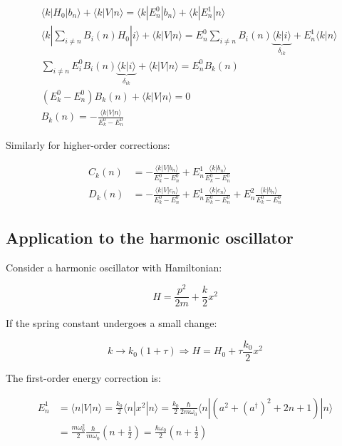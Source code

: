 \documentclass[italian]{HKNdocument}
\begin{document}
\begin{align}
&\langle k|H_0|b_n\rangle+\langle k|V|n\rangle=\langle k|E_n^0|b_n\rangle+\langle k|E_n^1|n\rangle\\
&\langle k|\sum_{i\neq n}B_i(n)H_0|i\rangle+\langle k|V|n\rangle=E_n^0\sum_{i\neq n}B_i(n)\underbrace{\langle k|i\rangle}_{\delta_{ik}}+E_n^1\langle k|n\rangle\\
&\sum_{i\neq n}E_i^0B_i(n)\underbrace{\langle k|i\rangle}_{\delta_{ik}}+\langle k|V|n\rangle=E_n^0B_k(n) \label{eq:13.17}\\
&(E_k^0-E_n^0)B_k(n)+\langle k|V|n\rangle=0\\
&B_k(n)=-\frac{\langle k|V|n\rangle}{E_k^0-E_n^0}
\end{align}

Similarly for higher-order corrections:

\begin{align}
C_k(n)&=-\frac{\langle k|V|b_n\rangle}{E_k^0-E_n^0}+E_n^1\frac{\langle k|b_n\rangle}{E_k^0-E_n^0} \label{eq:13.18}\\
D_k(n)&=-\frac{\langle k|V|c_n\rangle}{E_k^0-E_n^0}+E_n^1\frac{\langle k|c_n\rangle}{E_k^0-E_n^0}+E_n^2\frac{\langle k|b_n\rangle}{E_k^0-E_n^0}
\end{align}

\subsection{Application to the harmonic oscillator}
Consider a harmonic oscillator with Hamiltonian:

\begin{equation}
H=\frac{p^2}{2m}+\frac{k}{2}x^2 \label{eq:13.19}
\end{equation}

If the spring constant undergoes a small change:

\begin{equation}
k\rightarrow k_0(1+\tau)\Rightarrow H=H_0+\tau\frac{k_0}{2}x^2 \label{eq:13.20}
\end{equation}

The first-order energy correction is:

\begin{align}
E_n^1&=\langle n|V|n\rangle=\frac{k_0}{2}\langle n|x^2|n\rangle=\frac{k_0}{2}\frac{\hbar}{2m\omega_0}\langle n|(a^2+(a^\dagger)^2+2n+1)|n\rangle\\
&=\frac{m\omega_0^2}{2}\frac{\hbar}{m\omega_0}(n+\frac{1}{2})=\frac{\hbar\omega_0}{2}(n+\frac{1}{2}) \label{eq:13.21}
\end{align}
\end{document}
